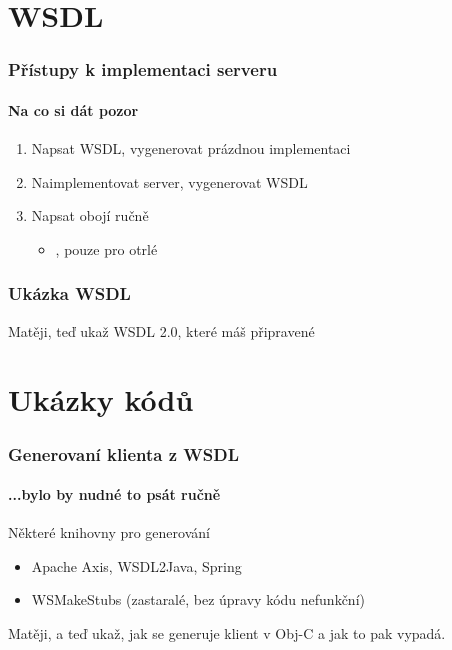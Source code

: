 \documentclass[12pt]{beamer}
\begin{document}
\section{WSDL}

\begin{frame}
  \frametitle{Přístupy k implementaci serveru}
  \framesubtitle{Na co si dát pozor}

  \begin{enumerate}
    \item Napsat WSDL, vygenerovat prázdnou implementaci
    \vspace{4mm}
    \item Naimplementovat server, vygenerovat WSDL
    \vspace{4mm}
    \item Napsat obojí ručně
    \begin{itemize}
      \item {}, pouze pro otrlé
    \end{itemize}
  \end{enumerate}
\end{frame}

\begin{frame}
  \frametitle{Ukázka WSDL}

  \begin{example}
    Matěji, teď ukaž WSDL 2.0, které máš připravené
  \end{example}
\end{frame}

\section{Ukázky kódů}

\begin{frame}
  \frametitle{Generovaní klienta z WSDL}
  \framesubtitle{...bylo by nudné to psát ručně}

	\begin{block}{Některé knihovny pro generování}
		\begin{itemize}
			\item {} Apache Axis, WSDL2Java, Spring
			\item {} WSMakeStubs (zastaralé, bez úpravy kódu nefunkční)
		\end{itemize}    	
  \end{block}
	\begin{example}
		Matěji, a teď ukaž, jak se generuje klient v Obj-C a jak to pak vypadá.
	\end{example}
\end{frame}
\end{document}
